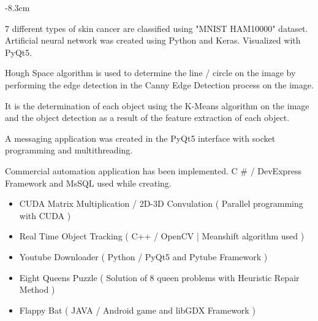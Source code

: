 \documentclass[10pt,a4paper]{altacv}
\begin{document}
\begin{adjustwidth}{}{-8.3cm}
\divider

7 different types of skin cancer are classified using "MNIST HAM10000" dataset. Artificial neural network was created using Python and Keras.
Visualized with PyQt5.

\divider

Hough Space algorithm is used to determine the line / circle on the image by performing the edge detection in the Canny Edge Detection process on the image.


\divider

It is the determination of each object using the K-Means algorithm on the image and the object detection as a result of the feature extraction of each object.


\divider

A messaging application was created in the PyQt5 interface with socket programming and multithreading.

\divider

Commercial automation application has been implemented.
C \# / DevExpress Framework and MsSQL used while creating.

\smallskip

\begin{itemize}
    \item CUDA Matrix Multiplication / 2D-3D Convulation ( Parallel programming with CUDA )
    \item Real Time Object Tracking ( C++ / OpenCV | Meanshift algorithm used )
    \item Youtube Downloader ( Python / PyQt5 and Pytube Framework )
    \item Eight Queens Puzzle ( Solution of 8 queen problems with Heuristic Repair Method )
    \item Flappy Bat ( JAVA / Android game and libGDX Framework )
    
\end{itemize}



\end{adjustwidth}
\end{document}
